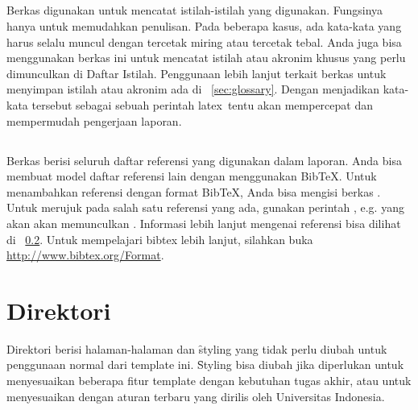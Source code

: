 \subsection{}
\label{sec:istilah-tex}
Berkas  digunakan untuk mencatat istilah-istilah yang digunakan.
Fungsinya hanya untuk memudahkan penulisan.
Pada beberapa kasus, ada kata-kata yang harus selalu muncul dengan tercetak miring atau tercetak tebal.
Anda juga bisa menggunakan berkas ini untuk mencatat istilah atau akronim khusus yang perlu dimunculkan di Daftar Istilah.
Penggunaan lebih lanjut terkait berkas  untuk menyimpan istilah atau akronim ada di \sect~\ref{sec:glossary}.
Dengan menjadikan kata-kata tersebut sebagai sebuah perintah \gls{latex}~tentu akan mempercepat dan mempermudah pengerjaan laporan.

\subsection{}
\label{sec:references-bib}
Berkas  berisi seluruh daftar referensi yang digunakan dalam
laporan.
Anda bisa membuat model daftar referensi lain dengan menggunakan BibTeX.
Untuk menambahkan referensi dengan format BibTeX, Anda bisa mengisi berkas .
Untuk merujuk pada salah satu referensi yang ada, gunakan perintah ,
e.g.  yang akan akan memunculkan \cite{book:sample}.
Informasi lebih lanjut mengenai referensi bisa dilihat di \sect~\ref{sec:references-bib}.
Untuk mempelajari bibtex lebih lanjut, silahkan buka \url{http://www.bibtex.org/Format}.


\section{Direktori }
\label{sec:internals}
Direktori  berisi halaman-halaman dan \f{styling} yang tidak perlu diubah untuk penggunaan normal dari template ini.
\f{Styling} bisa diubah jika diperlukan untuk menyesuaikan beberapa fitur template dengan kebutuhan tugas akhir, atau untuk menyesuaikan dengan aturan terbaru yang dirilis oleh Universitas Indonesia.

